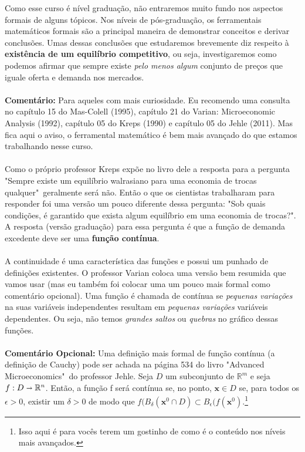 \documentclass[a4paper,11pt,oneside]{book}
\theoremstyle{definition}
\theoremstyle{break}
\begin{document}
Como esse curso é nível graduação, não entraremos muito fundo nos aspectos formais de alguns tópicos. Nos níveis de pós-graduação, os ferramentais matemáticos formais são a principal maneira de demonstrar conceitos e derivar conclusões. Umas dessas conclusões que estudaremos brevemente diz respeito à \textbf{existência de um equilíbrio competitivo}, ou seja, investigaremos como podemos afirmar que sempre existe \textit{pelo menos algum} conjunto de preços que iguale oferta e demanda nos mercados.
\\
\\
\textbf{Comentário:} Para aqueles com mais curiosidade. Eu recomendo uma consulta no capítulo 15 do Mas-Colell (1995), capítulo 21 do Varian: Microeconomic Analysis (1992), capítulo 05 do Kreps (1990) e capítulo 05 do Jehle (2011). Mas fica aqui o aviso, o ferramental matemático é bem mais avançado do que estamos trabalhando nesse curso.
\\
\\
Como o próprio professor Kreps expõe no livro dele a resposta para a pergunta "Sempre existe um equilíbrio walrasiano para uma economia de trocas qualquer"\ geralmente será não. Então o que os cientistas trabalharam para responder foi uma versão um pouco diferente dessa pergunta: "Sob quais condições, é garantido que exista algum equilíbrio em uma economia de trocas?". A resposta (versão graduação) para essa pergunta é que a função de demanda excedente deve ser uma \textbf{função contínua}.
\\
\\
A continuidade é uma característica das funções e possui um punhado de definições existentes. O professor Varian coloca uma versão bem resumida que vamos usar (mas eu também foi colocar uma um pouco mais formal como comentário opcional). Uma função é chamada de contínua se \textit{pequenas variações} na suas variáveis independentes resultam em \textit{pequenas variações} variáveis dependentes. Ou seja, não temos \textit{grandes saltos} ou \textit{quebras} no gráfico dessas funções.
\\
\\
\textbf{Comentário Opcional:} Uma definição mais formal de função contínua (a definição de Cauchy) pode ser achada na página 534 do livro "Advanced Microeconomics"\ do professor Jehle. Seja $D$ um subconjunto de $\mathbb{R}^m$ e seja $f : D \shortrightarrow \mathbb{R}^n$. Então, a função f será contínua se, no ponto, $\mathbf{x} \in D$ se, para todos os $\epsilon > 0$, existir um $\delta >0$ de modo que $f(B_{\delta}(\mathbf{x}^0 \cap D) \subset B_{\epsilon}(f(\mathbf{x}^0)$.\footnote{Isso aqui é para vocês terem um gostinho de como é o conteúdo nos níveis mais avançados.}
\end{document}

